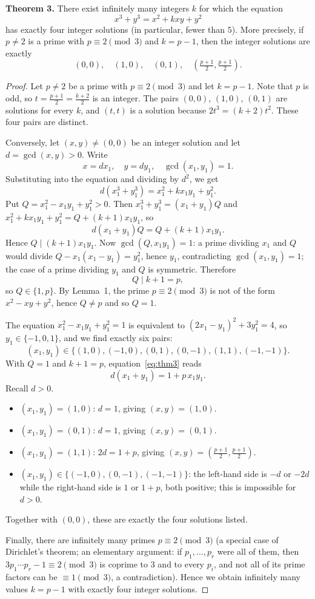 \begin{thmbox}
\textbf{Theorem 3.} There exist infinitely many integers $k$ for which the equation
\[
x^3 + y^3 = x^2 + kxy + y^2
\]
has exactly four integer solutions (in particular, fewer than $5$). More precisely, if $p\neq 2$ is a prime with $p\equiv 2 \pmod 3$ and $k=p-1$, then the integer solutions are exactly
\[
(0,0),\quad (1,0),\quad (0,1),\quad \left(\tfrac{p+1}{2},\tfrac{p+1}{2}\right).
\]
\end{thmbox}

\begin{proof}
Let $p\ne 2$ be a prime with $p\equiv 2\pmod 3$ and let $k=p-1$. Note that $p$ is odd, so $t=\frac{p+1}{2}=\frac{k+2}{2}$ is an integer. The pairs $(0,0)$, $(1,0)$, $(0,1)$ are solutions for every $k$, and $(t,t)$ is a solution because $2t^3=(k+2)t^2$. These four pairs are distinct.

Conversely, let $(x,y)\ne(0,0)$ be an integer solution and let $d=\gcd(x,y)>0$. Write
\[
x = dx_1, \quad y = dy_1, \quad \gcd(x_1,y_1)=1.
\]
Substituting into the equation and dividing by $d^2$, we get
\[
d(x_1^3 + y_1^3) = x_1^2 + kx_1y_1 + y_1^2.
\]
Put $Q=x_1^2-x_1y_1+y_1^2>0$. Then $x_1^3+y_1^3=(x_1+y_1)Q$ and $x_1^2+kx_1y_1+y_1^2=Q+(k+1)x_1y_1$, so
\begin{equation}\label{eq:thm3}
d(x_1+y_1)Q = Q+(k+1)x_1y_1 .
\end{equation}
Hence $Q\mid (k+1)x_1y_1$. Now $\gcd(Q,x_1y_1)=1$: a prime dividing $x_1$ and $Q$ would divide $Q-x_1(x_1-y_1)=y_1^2$, hence $y_1$, contradicting $\gcd(x_1,y_1)=1$; the case of a prime dividing $y_1$ and $Q$ is symmetric. Therefore
\[
Q\mid k+1=p,
\]
so $Q\in\{1,p\}$. By Lemma~1, the prime $p\equiv 2\pmod 3$ is not of the form $x^2-xy+y^2$, hence $Q\neq p$ and so $Q=1$.

The equation $x_1^2-x_1y_1+y_1^2=1$ is equivalent to $(2x_1-y_1)^2+3y_1^2=4$, so $y_1\in\{-1,0,1\}$, and we find exactly six pairs:
\[
(x_1,y_1)\in\{(1,0),(-1,0),(0,1),(0,-1),(1,1),(-1,-1)\}.
\]
With $Q=1$ and $k+1=p$, equation~\eqref{eq:thm3} reads
\[
d(x_1+y_1)=1+p\,x_1y_1 .
\]
Recall $d>0$.
\begin{itemize}
    \item $(x_1,y_1)=(1,0)$: $d=1$, giving $(x,y)=(1,0)$.
    \item $(x_1,y_1)=(0,1)$: $d=1$, giving $(x,y)=(0,1)$.
    \item $(x_1,y_1)=(1,1)$: $2d=1+p$, giving $(x,y)=\left(\frac{p+1}{2},\frac{p+1}{2}\right)$.
    \item $(x_1,y_1)\in\{(-1,0),(0,-1),(-1,-1)\}$: the left-hand side is $-d$ or $-2d$ while the right-hand side is $1$ or $1+p$, both positive; this is impossible for $d>0$.
\end{itemize}
Together with $(0,0)$, these are exactly the four solutions listed.

Finally, there are infinitely many primes $p\equiv 2\pmod 3$ (a special case of Dirichlet's theorem; an elementary argument: if $p_1,\dots,p_r$ were all of them, then $3p_1\cdots p_r-1\equiv 2\pmod 3$ is coprime to $3$ and to every $p_i$, and not all of its prime factors can be $\equiv 1\pmod 3$, a contradiction). Hence we obtain infinitely many values $k=p-1$ with exactly four integer solutions.
\end{proof}
